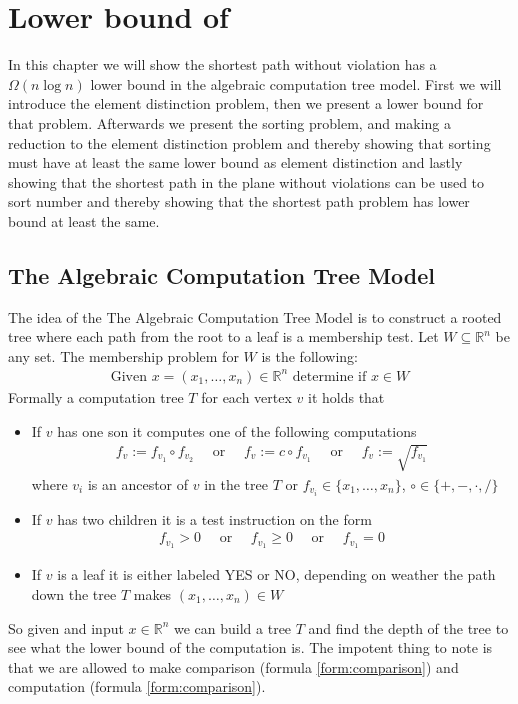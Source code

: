 \chapter{Lower bound of}
In this chapter we will show the shortest path without violation has a
$\Omega{(n\log n)}$ lower bound in the algebraic computation tree model.
First we will introduce the element distinction problem, then we present a
lower bound for that problem. Afterwards we present the sorting problem, and
making a reduction to the element distinction problem and thereby showing that
sorting must have at least the same lower bound as element distinction and
lastly showing that the shortest path in the plane without violations can be
used to sort number and thereby showing that the shortest path problem has
lower bound at least the same.
\section{The Algebraic Computation Tree Model}
The idea of the The Algebraic Computation Tree Model is to construct a rooted
tree where each path from the root to a leaf is a membership test.
Let $W \subseteq \mathbb{R}^n$ be any set. The membership problem for $W$ is
the following:
\begin{align}
	\text{Given } x = (x_1,\dots,x_n) \in \mathbb{R}^n \text{ determine if } x\in W
\end{align}
Formally a computation tree $T$ for each vertex $v$ it holds that
\begin{itemize}
  \item If $v$ has one son it computes one of the following computations
			\begin{align}
				f_v:=f_{v_1} \circ f_{v_2}\quad \text{ or }\quad
				f_v:=c \circ f_{v_1}\quad \text{ or }\quad
				f_v:=\sqrt{f_{v_1}}
				\label{form:computation}
			\end{align}
  	 where $v_i$ is an ancestor of $v$ in the tree $T$ or $f_{v_i}\in
  	 \{x_1,\dots,x_n\}$, $\circ \in \{+,-,\cdot,/\}$
   \item If $v$ has two children it is a test instruction on the form
		\begin{align}
			 f_{v_1}>0\quad \text{ or }\quad
			 f_{v_1}\geq 0\quad \text{ or }\quad
			 f_{v_1}= 0
			 \label{form:comparison}
		\end{align}
   \item If $v$ is a leaf it is either labeled YES or NO, depending on
  	 weather the path down the tree $T$ makes $(x_1,\dots,x_n)\in W$
\end{itemize}
So given and input $x\in \mathbb{R}^n$ we can build a tree $T$ and find the
depth of the tree to see what the lower bound of the computation is.
The impotent thing to note is that we are allowed to make comparison (formula
\ref{form:comparison}) and computation (formula \ref{form:comparison}).

